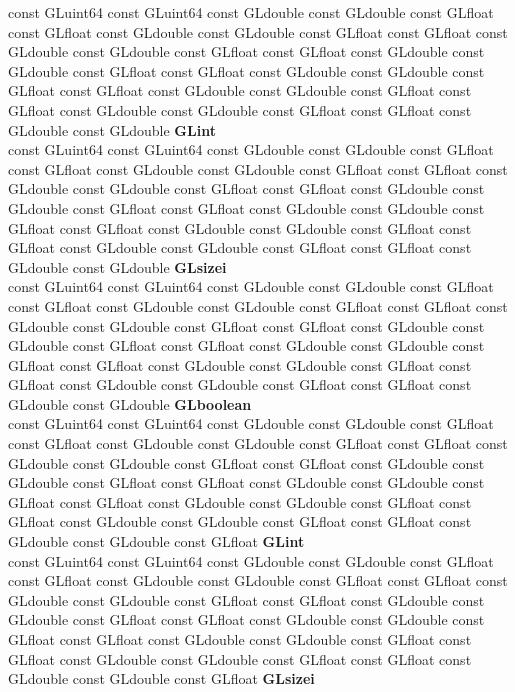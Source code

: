 \begin{DoxyCompactItemize}
\begin{tabbing}
\>const GLuint64 const GLuint64 const GLdouble const GLdouble const GLfloat const GLfloat const GLdouble const GLdouble const GLfloat const GLfloat const GLdouble const GLdouble const GLfloat const GLfloat const GLdouble const GLdouble const GLfloat const GLfloat const GLdouble const GLdouble const GLfloat const GLfloat const GLdouble const GLdouble const GLfloat const GLfloat const GLdouble const GLdouble const GLfloat const GLfloat const GLdouble const GLdouble {\bfseries GLint}\\
\>const GLuint64 const GLuint64 const GLdouble const GLdouble const GLfloat const GLfloat const GLdouble const GLdouble const GLfloat const GLfloat const GLdouble const GLdouble const GLfloat const GLfloat const GLdouble const GLdouble const GLfloat const GLfloat const GLdouble const GLdouble const GLfloat const GLfloat const GLdouble const GLdouble const GLfloat const GLfloat const GLdouble const GLdouble const GLfloat const GLfloat const GLdouble const GLdouble {\bfseries GLsizei}\\
\>const GLuint64 const GLuint64 const GLdouble const GLdouble const GLfloat const GLfloat const GLdouble const GLdouble const GLfloat const GLfloat const GLdouble const GLdouble const GLfloat const GLfloat const GLdouble const GLdouble const GLfloat const GLfloat const GLdouble const GLdouble const GLfloat const GLfloat const GLdouble const GLdouble const GLfloat const GLfloat const GLdouble const GLdouble const GLfloat const GLfloat const GLdouble const GLdouble {\bfseries GLboolean}\\
\>const GLuint64 const GLuint64 const GLdouble const GLdouble const GLfloat const GLfloat const GLdouble const GLdouble const GLfloat const GLfloat const GLdouble const GLdouble const GLfloat const GLfloat const GLdouble const GLdouble const GLfloat const GLfloat const GLdouble const GLdouble const GLfloat const GLfloat const GLdouble const GLdouble const GLfloat const GLfloat const GLdouble const GLdouble const GLfloat const GLfloat const GLdouble const GLdouble const GLfloat {\bfseries GLint}\\
\>const GLuint64 const GLuint64 const GLdouble const GLdouble const GLfloat const GLfloat const GLdouble const GLdouble const GLfloat const GLfloat const GLdouble const GLdouble const GLfloat const GLfloat const GLdouble const GLdouble const GLfloat const GLfloat const GLdouble const GLdouble const GLfloat const GLfloat const GLdouble const GLdouble const GLfloat const GLfloat const GLdouble const GLdouble const GLfloat const GLfloat const GLdouble const GLdouble const GLfloat {\bfseries GLsizei}\\

\end{tabbing}
\end{DoxyCompactItemize}
